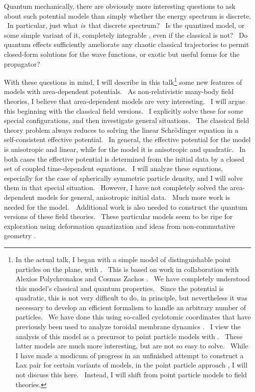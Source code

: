 \documentclass[a4paper,12pt]{article}%
\begin{document}
Quantum mechanically, there are obviously more interesting questions to ask
about such potential models than simply whether the energy spectrum is
discrete. \ In particular, just what \emph{is}\ that discrete spectrum? \ Is
the quantized model, or some simple variant of it, completely integrable
\cite{Jaffe}, even if the classical is not? \ Do quantum effects sufficiently
ameliorate any chaotic classical trajectories \cite{Gutzwiller} to permit
closed-form solutions for the wave functions, or exotic but useful forms
\cite{Cataplex} for the propagator?

With these questions in mind, I will describe in this talk\footnote{In the
actual talk, I began with a simple model of \coordHE{} distinguishable point
particles on the plane, with \coordHE{}. \ This is based on work in collaboration
with Alexios Polychronakos and Cosmas Zachos \cite{CPZ}. \ We have completely
understood this model's classical and quantum properties. \ Since the
potential is quadratic, this is not very difficult to do, in principle, but
nevertheless it was necessary to develop an efficient formalism to handle an
arbitrary number of particles. \ We have done this using so-called cyclotomic
coordinates that have previously been used to analyze toroidal membrane
dynamics \cite{FZ}. \ I view the analysis of this \coordHE{} model as a precursor
to point particle models with \coordHE{}. \ These latter models are much more
interesting, but are not so easy to solve. \ While I have made a modicum of
progress in an unfinished attempt to construct a Lax pair for certain variants
of \coordHE{} models, in the point particle approach \cite{Perelomov}, I will
not discuss this here. \ Instead, I will shift from point particle models to
field theories.} some new features of models with area-dependent potentials.
\ As non-relativistic many-body field theories, I believe that area-dependent
models are very interesting. \ I will argue this beginning with the classical
field versions. \ I explicitly solve these for some special configurations,
and then investigate general situations. \ The classical field theory problem
always reduces to solving the linear Schr\"{o}dinger equation in a
self-consistent effective potential. \ In general, the effective potential for
the \coordHE{} model is anisotropic and linear, while for the \coordHE{} model it is
anisotropic and quadratic. \ In both cases the effective potential is
determined from the initial data by a closed set of coupled time-dependent
equations. \ I will analyze these equations, especially for the case of
spherically symmetric particle density, and I will solve them in that special
situation. \ However, I have not completely solved the area-dependent models
for general, anisotropic initial data. \ Much more work is needed for the
\coordHE{} model.\ \ Additional work is also needed to construct the quantum
versions of these field theories. \ These particular models seem to be ripe
for exploration using deformation quantization \cite{Bayen,CFZ,CUZ} and ideas
from non-commutative geometry \cite{Gracia}.
\end{document}
